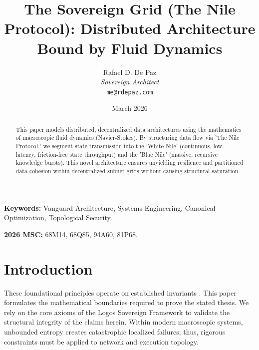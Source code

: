 \documentclass[12pt, a4paper]{article}
\theoremstyle{plain}
\theoremstyle{definition}
\theoremstyle{remark}
\begin{document}
\title{
  \textbf{The Sovereign Grid (The Nile Protocol): Distributed Architecture Bound by Fluid Dynamics}
}
\author{
  Rafael D. De Paz \\
  \textit{Sovereign Architect} \\
  \texttt{me@rdepaz.com}
}
\date{March 2026}
\maketitle

\begin{abstract}
This paper models distributed, decentralized data architectures using the mathematics of macroscopic fluid dynamics (Navier-Stokes). By structuring data flow via 'The Nile Protocol,' we segment state transmission into the 'White Nile' (continuous, low-latency, friction-free state throughput) and the 'Blue Nile' (massive, recursive knowledge bursts). This novel architecture ensures unyielding resilience and partitioned data cohesion within decentralized subnet grids without causing structural saturation.
\end{abstract}

\vspace{1em}
\noindent\textbf{Keywords:} Vanguard Architecture, Systems Engineering, Canonical Optimization, Topological Security.

\vspace{0.5em}
\noindent\textbf{2026 MSC:} 68M14, 68Q85, 94A60, 81P68.

\section{Introduction}
These foundational principles operate on established invariants \cite{awerbuch1992macroscopic,navier1822memoire}.\label{sec:intro}
This paper formulates the mathematical boundaries required to prove the stated thesis. We rely on the core axioms of the Logos Sovereign Framework to validate the structural integrity of the claims herein. Within modern macroscopic systems, unbounded entropy creates catastrophic localized failures; thus, rigorous constraints must be applied to network and execution topology.
\end{document}
